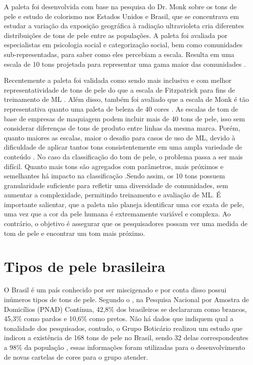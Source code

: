 A paleta foi desenvolvida com base na pesquisa do Dr. Monk sobre os tons de pele e estudo de colorismo nos Estados Unidos e Brasil, que se concentrava em estudar a variação da exposição geográfica à radiação ultravioleta cria diferentes distribuições de tons de pele entre as populações. A paleta foi avaliada por especialistas em psicologia social e categorização social, bem como comunidades sub-representadas, para saber como eles percebiam a escala. Resulta em uma escala de 10 tons projetada para representar uma gama maior das comunidades \cite{Monk_2019}.

Recentemente a paleta foi validada como sendo mais inclusiva e com melhor representatividade de tons de pele do que a escala de Fitzpatrick para fins de treinamento de ML \cite{Monk_2019}. Além disso, também foi avaliado que a escala de Monk é tão representativa quanto uma paleta de beleza de 40 cores \cite{Monk_2019}. As escalas de tom de base de empresas de maquiagem podem incluir mais de 40 tons de pele, isso sem considerar diferenças de tons de produto entre linhas da mesma marca. Porém, quanto maiores as escalas, maior o desafio para casos de uso de ML, devido à dificuldade de aplicar tantos tons consistentemente em uma ampla variedade de conteúdo \cite{Monk_2019}. No caso da classificação do tom de pele, o problema passa a ser mais difícil. Quanto mais tons são agregados com parâmetros, mais próximos e semelhantes há impacto na classificação \cite{Automatic_Skin_Tone_Extraction_for_Visagism_Applications}.Sendo assim, os 10 tons possuem granularidade suficiente para refletir uma diversidade de comunidades, sem aumentar a complexidade, permitindo treinamento e avaliação de ML. É importante salientar, que a paleta não planeja identificar uma cor exata de pele, uma vez que a cor da pele humana é extremamente variável e complexa. Ao contrário, o objetivo é assegurar que os pesquisadores possam ver uma medida de tom de pele e encontrar um tom mais próximo.

\section{Tipos de pele brasileira}
O Brasil é um país conhecido por ser miscigenado e por conta disso possui inúmeros tipos de tons de pele. Segundo o \cite{ibge_2022}, na Pesquisa Nacional por Amostra de Domicílios (PNAD) Contínua, 42,8\% dos brasileiros se declararam como brancos, 45,3\% como pardos e 10,6\% como pretos. Não há dados que indiquem qual a tonalidade dos pesquisados, contudo, o Grupo Boticário realizou um estudo que indicou a existência de 168 tons de pele no Brasil, sendo 32 delas correspondentes a 98\% da população \cite{168_tons}, essas informações foram utilizadas para o desenvolvimento de novas cartelas de cores para o grupo atender. 

